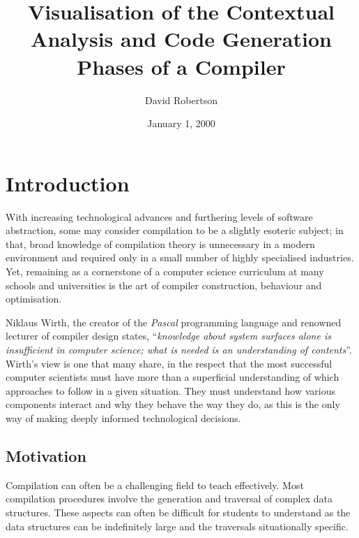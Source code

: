 \documentclass{l4proj}
\begin{document}
\title{Visualisation of the Contextual Analysis and Code Generation Phases of a Compiler}
\author{David Robertson}
\date{January 1, 2000}
\maketitle

\begin{abstract}

\end{abstract}

\educationalconsent
%
%
\tableofcontents

\chapter{Introduction}
With increasing technological advances and furthering levels of software abstraction, some may consider compilation to be a slightly esoteric subject; in that, broad knowledge of compilation theory is unnecessary in a modern environment and required only in a small number of highly specialised industries. Yet, remaining as a cornerstone of a computer science curriculum at many schools and universities is the art of compiler construction, behaviour and optimisation.

Niklaus Wirth, the creator of the \textit{Pascal} programming language and renowned lecturer of compiler design states, ``\textit{knowledge about system surfaces alone is insufficient in computer science; what is needed is an understanding of contents}''. Wirth's view is one that many share, in the respect that the most successful computer scientists must have more than a superficial understanding of which approaches to follow in a given situation. They must understand how various components interact and why they behave the way they do, as this is the only way of making deeply informed technological decisions.

\section{Motivation}
Compilation can often be a challenging field to teach effectively. Most compilation procedures involve the generation and traversal of complex data structures. These aspects can often be difficult for students to understand as the data structures can be indefinitely large and the traversals situationally specific. 
\end{document}
